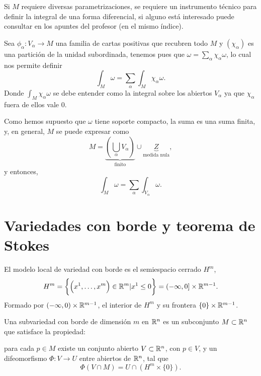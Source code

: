 \begin{obs}
    Si $M$ requiere diversas parametrizaciones, se requiere un instrumento t\'ecnico para definir la integral de una forma diferencial,
    si alguno está interesado puede consultar en los apuntes del profesor (en el mismo índice).
\end{obs}

\begin{defi}
    Sea $\phi_\alpha \colon V_\alpha \to M$ una familia de cartas positivas que recubren todo $M$ y $\left( \chi_\alpha \right)$ es una
    partición de la unidad subordinada, tenemos pues que $\omega = \sum\limits_\alpha \chi_\alpha \omega$, lo cual nos permite definir
    \[
        \int_M \omega = \sum_\alpha \int_M \chi_\alpha \omega.
    \]
    Donde $\int_M \chi_\alpha \omega$ se debe entender como la integral sobre los abiertos $V_\alpha$ ya que $\chi_\alpha$ fuera de ellos vale
    0.
\end{defi}

\begin{obs}
    Como hemos supuesto que $\omega$ tiene soporte compacto, la suma es una suma finita, y, en general, $M$ se puede expresar como
    \[
        M = \underbrace{\left( \bigcup_\alpha V_\alpha \right)}_{\text{finito}} \cup \underbrace{Z}_{\text{medida nula}},
    \]
    y entonces,
    \[
        \int_M \omega = \sum_\alpha \int_{V_\alpha} \omega.
    \]
\end{obs}

\section{Variedades con borde y teorema de Stokes}\label{section:5-8}

\begin{obs}
    El modelo local de variedad con borde es el semiespacio cerrado $H^m$,
    \[
        H^m = \left\{\left( x^1, \dots, x^m \right) \in \mathbb{R}^m \vert x^1 \leq 0\right\} = (-\infty, 0] \times \mathbb{R}^{m-1}.
    \]
    Formado por $(-\infty, 0) \times \mathbb{R}^{m-1}$, el interior de $H^m$ y su frontera $\{0\} \times \mathbb{R}^{m-1}$.
\end{obs}

\begin{defi}
    Una subvariedad con borde de dimensión $m$ en $\mathbb{R}^n$ es un subconjunto $M \subset \mathbb{R}^n$ que satisface
    la propiedad:

    para cada $p \in M$ existe un conjunto abierto $V \subset \mathbb{R}^n$, con $p \in V$, y un difeomorfismo
    $\Phi \colon V \to U$ entre abiertos de $\mathbb{R}^n$, tal que
    \[
        \Phi\left( V \cap M \right) = U \cap \left( H^m \times \{0\}\right).
    \]
\end{defi}

